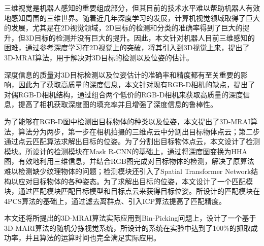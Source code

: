 \begin{cabstract}
  三维视觉是机器人感知的重要组成部分，但其目前的技术水平难以帮助机器人有效地感知周围的三维世界。随着近几年深度学习的发展，计算机视觉领域取得了巨大的发展，尤其是在2D视觉领域，2D目标的检测和分类的准确率得到了巨大的提升，但3D目标的检测并没有巨大的提升。因此，本文针对机器人目前三维感知的困难，通过参考深度学习在2D视觉上的突破，将其引入到3D视觉上来，提出了3D-MRAI算法，用于解决对3D目标的检测以及位姿的估计。

  深度信息的质量对3D目标检测以及位姿估计的准确率和精度都有至关重要的影响，因此为了获取高质量的深度信息，本文针对现有RGB-D相机的缺点，提出了对偶RGB-D相机结构，通过组合两个低价的RGB-D相机来获取高质量的深度信息，提高了相机获取深度图的填充率并且增强了深度信息的鲁棒性。

  为了能够在RGB-D图中检测出目标物体的种类以及位姿，本文提出了3D-MRAI算法，算法分为两步，第一步在相机拍摄的三维点云中分割出目标物体点云；第二步通过点云匹配算法求解出目标的位姿。为了分割出目标物体点云，本文设计了检测模块。所设计的检测模块在Mask R-CNN的基础上，通过将深度图变换为HHA图，有效地利用三维信息，并结合RGB图完成对目标物体的检测，解决了原算法难以检测缺少纹理物体的问题；检测模块还引入了Spatial Transformer Network结构以应对目标物体的各种姿态。为了求解出目标的位姿，本文设计了一个匹配模块，通过匹配模块匹配目标模型和目标点云来获得目标位姿。所设计的匹配模块在4PCS算法的基础上，通过滤去离群点、引入ICP算法提高了匹配精度。

  本文还将所提出的3D-MRAI算法实际应用到Bin-Picking问题上，设计了一个基于3D-MARI算法的随机分拣视觉系统，所设计的系统在实验中达到了100\%的抓取成功率，并且算法的运算时间也完全满足实际应用。
\end{cabstract}



